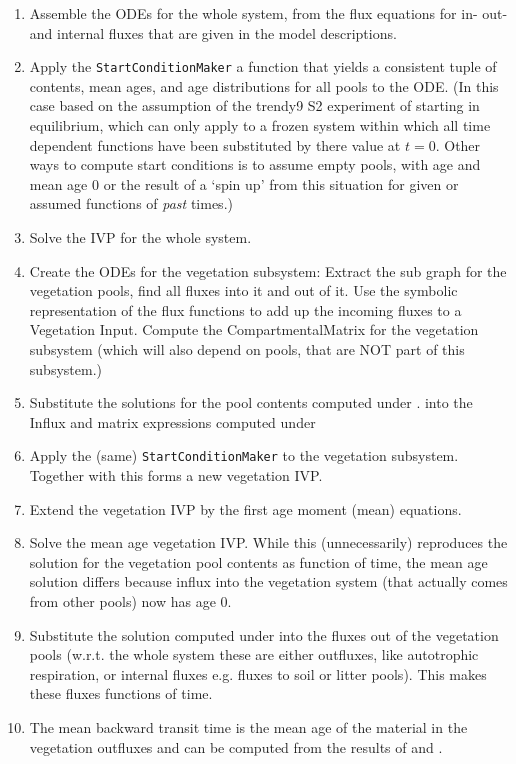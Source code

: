 \begin{enumerate} 
  \item 
    Assemble the ODEs for the whole system, from the flux
    equations for in- out- and internal fluxes that are given in the model
    descriptions.  
  \item 
    Apply the \texttt{StartConditionMaker} a function that
    yields a consistent tuple of contents, mean ages, and age distributions
    for all pools to the ODE.  (In this case based on the assumption of the
    trendy9 S2 experiment of starting in equilibrium, which can only apply to
    a frozen system within which all time dependent functions have been
    substituted by there value at $t=0$.  Other ways to compute
    start conditions is to assume empty pools, with age and mean age $0$ or the
    result of a `spin up' from this situation for given or assumed functions of
    \emph{past} times.) 
  \item 
    Solve the IVP for the whole system.
    \label{enum:solveIVP} 
  \item 
    \label{enum:symVeg} Create the ODEs for the
    vegetation subsystem: Extract the sub graph for the vegetation pools, find
    all fluxes into it and out of it.  Use the symbolic representation of the
    flux functions to add up the incoming fluxes to a Vegetation Input.
    Compute the CompartmentalMatrix for the vegetation subsystem (which will
    also depend on pools, that are NOT part of this subsystem.) 
  \item
        \label{enum:numVeg} Substitute the solutions for the pool contents
        computed under .  into the Influx and matrix
        expressions computed under 

  \item 
      Apply the (same) \texttt{StartConditionMaker} to the vegetation
      subsystem.  Together with  this forms a new
      vegetation IVP.
      
  \item 
    Extend the vegetation IVP by the first age moment (mean) equations.
  \item 
    \label{enum:meanAgeVeg} Solve the mean age vegetation IVP. 
    While this (unnecessarily) reproduces the solution for the vegetation
    pool contents as function of time, the mean age solution differs because
    influx into the vegetation system (that actually comes from other pools) now
    has age 0.  \item \label{enum:numOutVeg} Substitute the solution computed under
     into the fluxes out of the vegetation pools (w.r.t.
    the whole system these are either outfluxes, like autotrophic respiration,
    or internal fluxes e.g. fluxes to soil or litter pools).  This makes
    these fluxes functions of time.  \item The mean backward transit time is
    the mean age of the material in the vegetation outfluxes and can be
    computed from the results of  and
    .  
\end{enumerate} 


